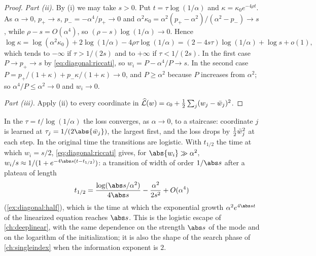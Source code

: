 \begin{refsection}
\begin{proof}
\emph{Part (ii).} By (i) we may take $s>0$. Put $t=\tau\log(1/\alpha)$ and $\kappa=\kappa_0e^{-4\rho t}$. As $\alpha\to0$, $p_+\to s$, $p_-=-\alpha^4/p_+\to0$ and $\alpha^2\kappa_0=\alpha^2(p_+-\alpha^2)/(\alpha^2-p_-)\to s$, while $\rho-s=O(\alpha^4)$, so $(\rho-s)\log(1/\alpha)\to0$. Hence
\[
  \log\kappa=\log(\alpha^2\kappa_0)+2\log(1/\alpha)-4\rho\tau\log(1/\alpha)=(2-4s\tau)\log(1/\alpha)+\log s+o(1),
\]
which tends to $-\infty$ if $\tau>1/(2s)$ and to $+\infty$ if $\tau<1/(2s)$. In the first case $P\to p_+\to s$ by \eqref{eq:diagonal:riccati}, so $w_i=P-\alpha^4/P\to s$. In the second case $P=p_+/(1+\kappa)+p_-\kappa/(1+\kappa)\to0$, and $P\ge\alpha^2$ because $P$ increases from $\alpha^2$; so $\alpha^4/P\le\alpha^2\to0$ and $w_i\to0$.

\emph{Part (iii).} Apply (ii) to every coordinate in $\widehat{\mathcal{L}}(w)=c_0+\frac12\sum_j(w_j-\bar w_j)^2$.
\end{proof}

In the  $\tau=t/\log(1/\alpha)$ the loss converges, as $\alpha\to0$, to a staircase: coordinate $j$ is learned at $\tau_j=1/(2\abs{\diagbar_j})$, the largest first, and the loss drops by $\frac12\bar w_j^2$ at each step. In the original time the transitions are logistic. With $t_{1/2}$ the time at which $w_i=s/2$, \eqref{eq:diagonal:riccati} gives, for $\abs{w_i}\gg\alpha^2$, $w_i/s\approx1/(1+e^{-4\abs s(t-t_{1/2})})$: a transition of width of order $1/\abs s$ after a plateau of length
\begin{equation}\label{eq:diagonal:thalf}
  t_{1/2}=\frac{\log(\abs s/\alpha^2)}{4\abs s}-\frac{\alpha^2}{2s^2}+O(\alpha^4)
\end{equation}
(\cref{ex:diagonal:half}), which is the time at which the exponential growth $\alpha^2e^{4\abs st}$ of the linearized equation reaches $\abs s$. This is the logistic escape of \cref{ch:deeplinear}, with the same dependence on the strength $\abs s$ of the mode and on the logarithm of the initialization; it is also the shape of the search phase of \cref{ch:singleindex} when the information exponent is $2$.


\end{refsection}
